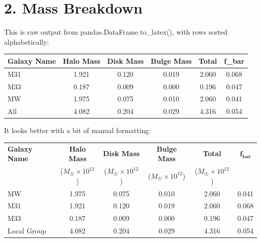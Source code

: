 

\setlength{\parskip}{0.2em}
\setlength{\skip\footins}{20pt}

\newcommand{\hmwkClass}{ASTR 400B}
\newcommand{\hmwkTitle}{Homework 3}
\newcommand{\hmwkDueDate}{Feb 6, 2020}



	
\maketitle

\section*{2. Mass Breakdown}

This is raw output from pandas.DataFrame.to\_latex(), with rows sorted alphabetically:\\

\begin{tabular}{lccccc}
	\toprule
	Galaxy Name &  Halo Mass &  Disk Mass &  Bulge Mass &  Total &  f\_bar \\
	\midrule
	M31 &      1.921 &      0.120 &       0.019 &  2.060 &  0.068 \\
	M33 &      0.187 &      0.009 &       0.000 &  0.196 &  0.047 \\
	MW &      1.975 &      0.075 &       0.010 &  2.060 &  0.041 \\
	All &      4.082 &      0.204 &       0.029 &  4.316 &  0.054 \\
	\bottomrule
\end{tabular}\vspace{5mm}

It looks better with a bit of manual formatting:\\

\begin{tabular}{lccccc}
	\toprule
	\textbf{Galaxy Name} &  \textbf{Halo Mass}  &  \textbf{Disk Mass} &  \textbf{Bulge Mass} &  \textbf{Total} &  $\mathbf{f_{bar}}$ \\
	 & ($M_\Sun \times 10^{12}$) & ($M_\Sun \times 10^{12}$) & ($M_\Sun \times 10^{12}$) & ($M_\Sun \times 10^{12}$) & \\
	\midrule
	MW &  1.975 &  0.075 &   0.010 &  2.060 &  0.041 \\
	M31 &  1.921 &  0.120 &   0.019 &  2.060 &  0.068 \\
	M33 &  0.187 &  0.009 &   0.000 &  0.196 &  0.047 \\
	\midrule
	Local Group &  4.082 &  0.204 &   0.029 &  4.316 &  0.054 \\
	\bottomrule
\end{tabular}\vspace{5mm}

